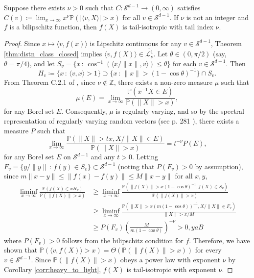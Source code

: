 \documentclass[../../thesis.tex]{subfiles}
\begin{document}
\begin{theorem}
  Suppose there exists $\nu > 0$ such that $C:\mathcal{S}^{d-1}\to(0,\infty)$ satisfies $C(v) \coloneqq \lim_{x \to \infty}x^{\nu}\mathbb{P}(|\langle v, X\rangle| > x)$ for all $v \in \mathcal{S}^{d-1}$. If $\nu$ is not an integer and $f$ is a bilipschitz function,
  then $f(X)$ is tail-isotropic with tail index $\nu$.
\end{theorem}
\begin{proof}
  Since $x \mapsto \langle v, f(x)\rangle$ is Lipschitz continuous for any $v \in \mathcal{S}^{d-1}$, Theorem \ref{thm:distn_class_closed} implies $\langle v, f(X)\rangle \in \overline{\mathcal{L}_{\nu}^{1}}$. Let $\theta \in (0,\pi/2)$ (say, $\theta = \pi / 4$), and let $S_v = \{x\, : \, \cos^{-1}(\langle x/\|x\|, v\rangle)\leq\theta\}$ for each $v \in \mathcal{S}^{d-1}$. Then
  \[
    H_v \coloneqq \{x\,:\,\langle v, x \rangle > 1\} \supset \{x\,:\,\|x\| > (1-\cos\theta)^{-1}\} \cap S_v.
  \]
  From Theorem C.2.1 of \citet{buraczewski2016stochastic}, since $\nu \not \in \mathbb{Z}$, there exists a non-zero measure $\mu$ such that
  \[
    \mu(E) = \lim_{x \to \infty} \frac{\mathbb{P}(x^{-1}X \in E)}{\mathbb{P}(\|X\| > x)},
  \]
  for any Borel set $E$. Consequently, $\mu$ is regularly varying, and so
  by the spectral representation of regularly varying random vectors (see p. 281 \citet{buraczewski2016stochastic}), there exists a measure $P$ such that
  \[
    \lim_{x \to \infty}\frac{\mathbb{P}(\|X\|>tx, X/\|X\| \in E)}{\mathbb{P}(\|X\| > x)} = t^{-\nu} P(E),
  \]
  for any Borel set $E$ on $\mathcal{S}^{d-1}$ and any $t > 0$. Letting $F_v = \{y / \|y\|\,:\, f(y) \in S_v\} \subset \mathcal{S}^{d-1}$ (noting that $P(F_v) > 0$ by assumption), since $m\|x - y\| \leq \|f(x) - f(y)\| \leq M\|x - y\|$ for all $x,y$,
  \begin{align*}
    \liminf_{x \to \infty}
    \frac{\mathbb{P}(f(X) \in x H_v)}{\mathbb{P}(\|f(X)\| > x)}
     & \geq \liminf_{x \to \infty}\frac{\mathbb{P}(\|f(X)\| > x(1-\cos\theta)^{-1}, f(X) \in S_v)}{\mathbb{P}(\|f(X)\| > x)} \\
     & \geq \liminf_{x \to \infty}\frac{\mathbb{P}(\|X\| > x(m(1-\cos\theta))^{-1}, X/\|X\| \in F_v)}{\|X\| > x / M}         \\
     & \geq P(F_v) \left(\frac{M}{m(1-\cos\theta)}\right)^{-\nu} > 0,
    yaB\end{align*}
  where $P(F_v) > 0$ follows from the bilipschitz condition for $f$. Therefore, we have shown that $\mathbb{P}(\langle v, f(X)\rangle > x) = \Theta(\mathbb{P}(\|f(X)\| > x))$ for every $v \in \mathcal{S}^{d-1}$.
  Since $\mathbb{P}(\|f(X)\| > x)$ obeys a power law with exponent $\nu$ by Corollary \ref{corr:heavy_to_light}, $f(X)$ is tail-isotropic with exponent $\nu$.
\end{proof}
\end{document}
